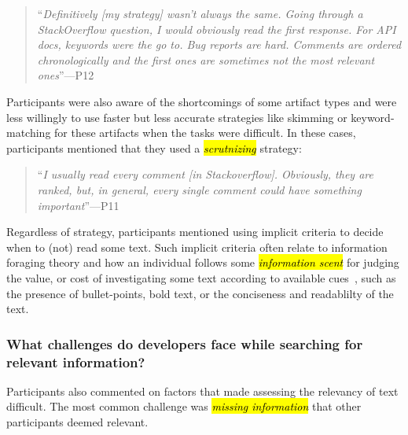 
\smallskip
\begin{footnotesize}
\begin{quote}
    ``\textit{Definitively [my strategy] wasn't always the same. Going through a StackOverflow question, I would obviously read the first response. For API docs, keywords were the go to. Bug reports are hard. Comments are ordered chronologically and the first ones are sometimes not the most relevant ones}''---P12
\end{quote}
\end{footnotesize}


Participants were also aware of the shortcomings of some artifact types and were less willingly to use faster but less accurate strategies like skimming or keyword-matching for these artifacts when the tasks were difficult. 
In these cases, participants mentioned that they used a \hl{\textit{scrutnizing}} strategy:


\smallskip
\begin{footnotesize}
\begin{quote}
    ``\textit{I usually read every comment [in Stackoverflow]. Obviously, they are ranked, but, in general, every single comment could have something important}''---P11
\end{quote}
\end{footnotesize}
    


Regardless of strategy, participants mentioned using 
implicit criteria to decide when to (not) read some text.
Such implicit criteria often relate to information foraging theory and how an individual follows some \hl{\textit{information scent}} for judging the value, or cost of investigating some text according to available cues~\cite{Pirolli1999}, such as the presence of bullet-points, bold text, or the conciseness and readablilty of the text.



\subsubsection{What challenges do developers face while searching for relevant information?}
\label{cp3:search-challenges}


Participants also commented on factors that made assessing the relevancy of text difficult.
The most common challenge was \hl{\textit{missing information}} that other participants deemed relevant.



